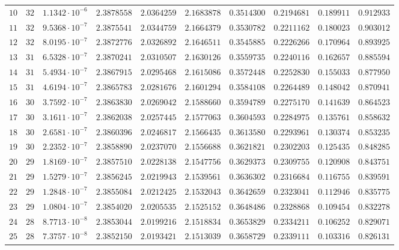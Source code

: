 {\begin{longtable}{@{}rrrrrrrrrr@{}}
$10$ & $32$ & $1.1342\cdot10^{-6}$ & $2.3878558$ & $2.0364259$ & $2.1683878$ & $0.3514300$ & $0.2194681$ & $0.189911$ & $0.912933$\\
$11$ & $32$ & $9.5368\cdot10^{-7}$ & $2.3875541$ & $2.0344759$ & $2.1664379$ & $0.3530782$ & $0.2211162$ & $0.180023$ & $0.903012$\\
$12$ & $32$ & $8.0195\cdot10^{-7}$ & $2.3872776$ & $2.0326892$ & $2.1646511$ & $0.3545885$ & $0.2226266$ & $0.170964$ & $0.893925$\\
$13$ & $31$ & $6.5328\cdot10^{-7}$ & $2.3870241$ & $2.0310507$ & $2.1630126$ & $0.3559735$ & $0.2240116$ & $0.162657$ & $0.885594$\\
$14$ & $31$ & $5.4934\cdot10^{-7}$ & $2.3867915$ & $2.0295468$ & $2.1615086$ & $0.3572448$ & $0.2252830$ & $0.155033$ & $0.877950$\\
$15$ & $31$ & $4.6194\cdot10^{-7}$ & $2.3865783$ & $2.0281676$ & $2.1601294$ & $0.3584108$ & $0.2264489$ & $0.148042$ & $0.870941$\\
$16$ & $30$ & $3.7592\cdot10^{-7}$ & $2.3863830$ & $2.0269042$ & $2.1588660$ & $0.3594789$ & $0.2275170$ & $0.141639$ & $0.864523$\\
$17$ & $30$ & $3.1611\cdot10^{-7}$ & $2.3862038$ & $2.0257445$ & $2.1577063$ & $0.3604593$ & $0.2284975$ & $0.135761$ & $0.858632$\\
$18$ & $30$ & $2.6581\cdot10^{-7}$ & $2.3860396$ & $2.0246817$ & $2.1566435$ & $0.3613580$ & $0.2293961$ & $0.130374$ & $0.853235$\\
$19$ & $30$ & $2.2352\cdot10^{-7}$ & $2.3858890$ & $2.0237070$ & $2.1556688$ & $0.3621821$ & $0.2302203$ & $0.125435$ & $0.848285$\\
$20$ & $29$ & $1.8169\cdot10^{-7}$ & $2.3857510$ & $2.0228138$ & $2.1547756$ & $0.3629373$ & $0.2309755$ & $0.120908$ & $0.843751$\\
$21$ & $29$ & $1.5279\cdot10^{-7}$ & $2.3856245$ & $2.0219943$ & $2.1539561$ & $0.3636302$ & $0.2316684$ & $0.116755$ & $0.839591$\\
$22$ & $29$ & $1.2848\cdot10^{-7}$ & $2.3855084$ & $2.0212425$ & $2.1532043$ & $0.3642659$ & $0.2323041$ & $0.112946$ & $0.835775$\\
$23$ & $29$ & $1.0804\cdot10^{-7}$ & $2.3854020$ & $2.0205535$ & $2.1525152$ & $0.3648486$ & $0.2328868$ & $0.109454$ & $0.832278$\\
$24$ & $28$ & $8.7713\cdot10^{-8}$ & $2.3853044$ & $2.0199216$ & $2.1518834$ & $0.3653829$ & $0.2334211$ & $0.106252$ & $0.829071$\\
$25$ & $28$ & $7.3757\cdot10^{-8}$ & $2.3852150$ & $2.0193421$ & $2.1513039$ & $0.3658729$ & $0.2339111$ & $0.103316$ & $0.826131$\\

\end{longtable}}
